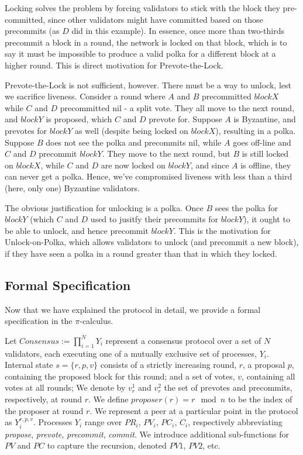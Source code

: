 Locking solves the problem by forcing validators to stick with the block they pre-committed, 
since other validators might have committed based on those precommits (as $D$ did in this example).
In essence, once more than two-thirds precommit a block in a round, the network is locked on that block,
which is to say it must be impossible to produce a valid polka for a different block at a higher round.
This is direct motivation for Prevote-the-Lock.

Prevote-the-Lock is not sufficient, however. 
There must be a way to unlock, lest we sacrifice liveness.
Consider a round where $A$ and $B$ precommitted $blockX$ while $C$ and $D$ precommitted nil - a split vote.
They all move to the next round, and $blockY$ is proposed, which $C$ and $D$ prevote for.
Suppose $A$ is Byzantine, and prevotes for $blockY$ as well (despite being locked on $blockX$), resulting in a polka.
Suppose $B$ does not see the polka and precommits nil, while $A$ goes off-line and $C$ and $D$ precommit $blockY$. 
They move to the next round, but $B$ is still locked on $blockX$, while $C$ and $D$ are now locked on $blockY$, 
and since $A$ is offline, they can never get a polka. 
Hence, we've compromised liveness with less than a third (here, only one) Byzantine validators.

The obvious justification for unlocking is a polka. 
Once $B$ sees the polka for $blockY$ (which $C$ and $D$ used to jusitfy their precommits for $blockY$), 
it ought to be able to unlock, and hence precommit $blockY$.
This is the motivation for Unlock-on-Polka, 
which allows validators to unlock (and precommit a new block),
if they have seen a polka in a round greater than that in which they locked.

\subsection{Formal Specification}

Now that we have explained the protocol in detail, 
we provide a formal specification in the $\pi$-calculus.

Let $Consensus := \prod_{i=1}^N Y_i $ represent a consensus protocol
over a set of $N$ validators, each executing one of a mutually exclusive set of processes, $Y_i$.
Internal state $s = \{r, p, v \}$ consists of a strictly increasing round, $r$,
a proposal $p$, containing the proposed block for this round;
and a set of votes, $v$, containing all votes at all rounds;
We denote by $v_r^1$ and $v_r^2$ the set of prevotes and precommits, respectively, at round $r$.
We define $proposer(r) = r \mod n$ to be the index of the proposer at round $r$.
We represent a peer at a particular point in the protocol as $Y_i^{r, p, v}$.
Processes $Y_i$ range over $PR_i$, $PV_i$, $PC_i$, $C_i$,
respectively abbreviating 
\emph{propose}, \emph{prevote}, \emph{precommit}, \emph{commit}.
We introduce additional sub-functions for $PV$ and $PC$ to capture the recursion,
denoted $PV1$, $PV2$, etc.

